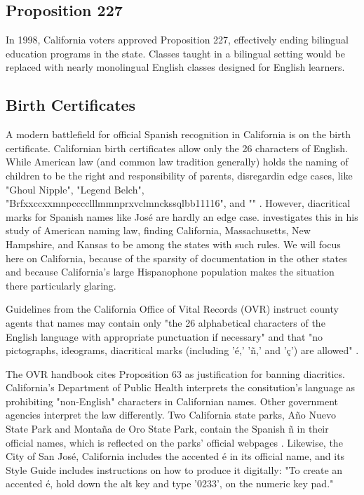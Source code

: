 \subsection{Proposition 227}

In 1998, California voters approved Proposition 227, effectively ending
bilingual education programs in the state. Classes taught in a bilingual setting
would be replaced with nearly monolingual English classes designed for English
learners.

\subsection{Birth Certificates}

A modern battlefield for official Spanish recognition in California is on the
birth certificate. Californian birth certificates allow only the 26 characters
of English. While American law (and common law tradition generally) holds the
naming of children to be the right and responsibility of parents, disregardin
edge cases, like "Ghoul Nipple", "Legend Belch",
"Brfxxccxxmnpcccclllmmnprxvclmnckssqlbb11116", and "" \parencite{larson11}.
However, diacritical marks for Spanish names like José are hardly an edge case.
\textcite[5]{larson11} investigates this in his study of American naming law,
finding California, Massachusetts, New Hampshire, and Kansas to be among the
states with such rules. We will focus here on California, because of the
sparsity of documentation in the other states and because California's large
Hispanophone population makes the situation there particularly glaring.

Guidelines from the California Office of Vital Records (OVR) instruct county
agents that names may contain only "the 26 alphabetical characters of the
English language with appropriate punctuation if necessary" and that "no
pictographs, ideograms, diacritical marks (including 'é,' 'ñ,' and 'ç') are
allowed" \parencite{larson11}.

The OVR handbook cites Proposition 63 as justification for banning diacritics.
California's Department of Public Health interprets the consitution's language
as prohibiting "non-English" characters in Californian names. Other government
agencies interpret the law differently. Two California state parks, Año Nuevo
State Park and Montaña de Oro State Park, contain the Spanish ñ in their
official names, which is reflected on the parks' official webpages
\parencite{año-nuevo} \parencite{montaña-de-oro}. Likewise, the City of San
José, California includes the accented é in its official name, and its Style
Guide includes instructions on how to produce it digitally: "To create an
accented é, hold down the alt key and type '0233'‚ on the numeric key pad."
\textcite{san-josé}

